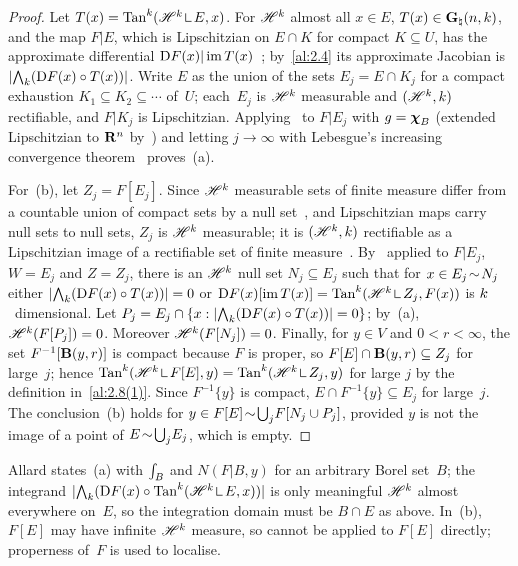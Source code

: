\begin{proof}
    Let $T(x) = \Tan^{\vdim}(\HM^{\vdim} \restrict E, x)$. For $\mathscr{H}^{k}$ almost all $x \in E$,
    $T(x) \in \mathbf{G}_{\natural}(n,k)$, and the map $F | E$, which is Lipschitzian on $E \cap K$ for
    compact $K \subseteq U$, has the approximate differential $\mathrm{D} F(x) | \operatorname{im}
    T(x)$~\cite[3.2.16, 3.2.19]{Federer1969}; by~\ref{al:2.4} its approximate Jacobian is
    $|{\textstyle\boldsymbol{\bigwedge}}_{{k}}(\mathrm{D} F(x) \circ T(x))|$. Write $E$ as the union of the sets $E_j = E \cap
    K_j$ for a compact exhaustion $K_1 \subseteq K_2 \subseteq \cdots$ of~$U$; each~$E_j$ is
    $\mathscr{H}^{k}$ measurable and $(\mathscr{H}^{k},k)$ rectifiable, and $F | K_j$ is Lipschitzian.
    Applying~\cite[3.2.20]{Federer1969} to $F|E_j$ with $g = \boldsymbol{\chi}_{B}$ (extended Lipschitzian to
    $\mathbf{R}^{n}$ by~\cite[2.10.43]{Federer1969}) and letting $j \to \infty$ with Lebesgue's
    increasing convergence theorem~\cite[2.4.7]{Federer1969} proves~(a).

    For~(b), let $Z_j = F[E_j]$. Since $\mathscr{H}^{k}$ measurable sets of finite measure differ from
    a countable union of compact sets by a null set~\cite[2.2.3, 2.2.5]{Federer1969}, and
    Lipschitzian maps carry null sets to null sets, $Z_j$ is $\mathscr{H}^{k}$ measurable; it is
    $(\mathscr{H}^{k},k)$ rectifiable as a Lipschitzian image of a rectifiable set of finite
    measure~\cite[3.2.14]{Federer1969}. By~\cite[3.2.22(1)]{Federer1969} applied to $F | E_j$,
    $W = E_j$ and $Z = Z_j$, there is an $\mathscr{H}^{k}$ null set $N_j \subseteq E_j$ such that for
    $x \in E_j \!\sim\! N_j$ either $|{\textstyle\boldsymbol{\bigwedge}}_{{k}}(\mathrm{D} F(x) \circ T(x))| = 0$ or $\uD F(x)[\im
    T(x)] = \Tan^{\vdim}(\HM^{\vdim} \restrict Z_j, F(x))$ is $k$~dimensional. Let $P_j = E_j
    \cap \{ x : |{\textstyle\boldsymbol{\bigwedge}}_{{k}}(\mathrm{D} F(x) \circ T(x))| = 0 \}$; by~(a), $\mathscr{H}^{k}(F[P_j]) = 0$.
    Moreover $\mathscr{H}^{k}(F[N_j]) = 0$. Finally, for $y \in V$ and $0 < r < \infty$, the set
    $F^{-1}[\mathbf{B}(y,r)]$ is compact because $F$ is proper, so $F[E] \cap \mathbf{B}(y,r) \subseteq
    Z_j$ for large~$j$; hence $\Tan^{\vdim}(\HM^{\vdim} \restrict F[E], y) = \Tan^{\vdim}(\HM^{\vdim}
    \restrict Z_j, y)$ for large $j$ by the definition in~\ref{al:2.8(1)}. Since $F^{-1}\{y\}$ is
    compact, $E \cap F^{-1}\{y\} \subseteq E_j$ for large~$j$. The conclusion~(b) holds for $y
    \in F[E] \!\sim\! {{\textstyle \bigcup}}_j F[N_j \cup P_j]$, provided $y$ is not the image of a point of $E
    \!\sim\! {{\textstyle \bigcup}}_j E_j$, which is empty.
\end{proof}

\begin{remark}
    \label{rem:2.8(6)}
    Allard states~(a) with ${\textstyle\int_{B}^{}}$ and $N(F|B,y)$ for an arbitrary Borel set~$B$; the
    integrand $|\extpower{\vdim}(\uD F(x) \circ \Tan^{\vdim}(\HM^{\vdim} \restrict E, x))|$ is
    only meaningful $\mathscr{H}^{k}$ almost everywhere on~$E$, so the integration domain must be
    $B \cap E$ as above. In~(b), $F[E]$ may have infinite $\mathscr{H}^{k}$ measure, so
    \cite[3.2.22]{Federer1969} cannot be applied to $F[E]$ directly; properness of~$F$ is used
    to localise.
\end{remark}

